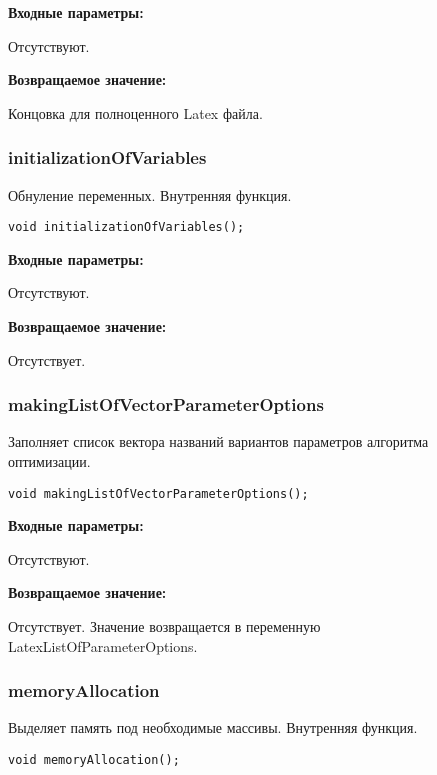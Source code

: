 \documentclass[a4paper,12pt]{article}
\begin{document}
\textbf{Входные параметры:}

Отсутствуют.

\textbf{Возвращаемое значение:}

Концовка для полноценного Latex файла.


\subsubsection{initializationOfVariables}\label{initializationOfVariables}

Обнуление переменных. Внутренняя функция.


\begin{lstlisting}[label=code_syntax_initializationOfVariables,caption=Синтаксис]
void initializationOfVariables();
\end{lstlisting}

\textbf{Входные параметры:}

Отсутствуют.

\textbf{Возвращаемое значение:}

Отсутствует.


\subsubsection{makingListOfVectorParameterOptions}\label{makingListOfVectorParameterOptions}

Заполняет список вектора названий вариантов параметров алгоритма оптимизации.


\begin{lstlisting}[label=code_syntax_makingListOfVectorParameterOptions,caption=Синтаксис]
void makingListOfVectorParameterOptions();
\end{lstlisting}

\textbf{Входные параметры:}

Отсутствуют.

\textbf{Возвращаемое значение:}

Отсутствует. Значение возвращается в переменную LatexListOfParameterOptions.


\subsubsection{memoryAllocation}\label{memoryAllocation}

Выделяет память под необходимые массивы. Внутренняя функция.


\begin{lstlisting}[label=code_syntax_memoryAllocation,caption=Синтаксис]
void memoryAllocation();
\end{lstlisting}
\end{document}
